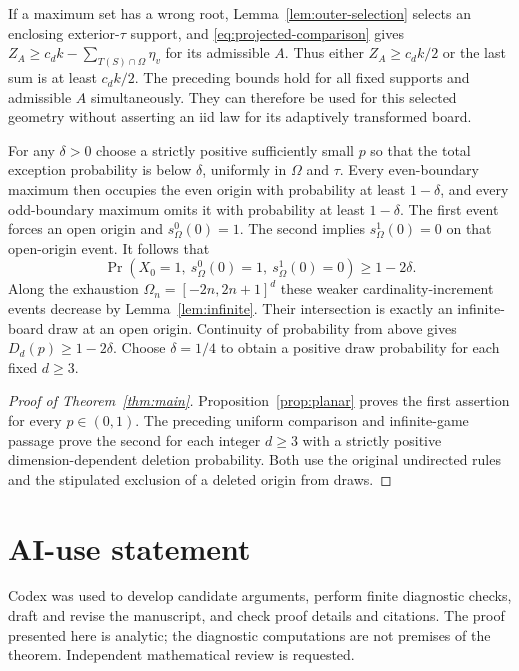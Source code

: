 \documentclass[11pt,a4paper]{article}
\numberwithin{equation}{section}
\begin{document}
If a maximum set has a wrong root, Lemma~\ref{lem:outer-selection}
selects an enclosing exterior-$\tau$ support, and
\eqref{eq:projected-comparison} gives
$Z_A\ge c_dk-\sum_{T(S)\cap\Omega}\eta_v$ for its admissible $A$.
Thus either $Z_A\ge c_dk/2$ or the last sum is at least $c_dk/2$.
The preceding bounds hold for all fixed supports and admissible $A$
simultaneously. They can therefore be used for this selected geometry
without asserting an iid law for its adaptively transformed board.

For any $\delta>0$ choose a strictly positive sufficiently small $p$
so that the total exception probability is below $\delta$, uniformly
in $\Omega$ and $\tau$. Every even-boundary maximum then occupies the
even origin with probability at least $1-\delta$, and every odd-boundary
maximum omits it with probability at least $1-\delta$.
The first event forces an open origin and $s_\Omega^0(0)=1$.
The second implies $s_\Omega^1(0)=0$ on that open-origin event.
It follows that
\[
 \Pr(X_0=1,\ s_\Omega^0(0)=1,\ s_\Omega^1(0)=0)\ge1-2\delta.
\]
Along the exhaustion $\Omega_n=[-2n,2n+1]^d$ these weaker
cardinality-increment events decrease by Lemma~\ref{lem:infinite}.
Their intersection is exactly an infinite-board draw at an open origin.
Continuity of probability from above gives $D_d(p)\ge1-2\delta$.
Choose $\delta=1/4$ to obtain a positive draw probability for each
fixed $d\ge3$.

\begin{proof}[Proof of Theorem~\ref{thm:main}]
Proposition~\ref{prop:planar} proves the first assertion for every
$p\in(0,1)$. The preceding uniform comparison and infinite-game passage
prove the second for each integer $d\ge3$ with a strictly positive
dimension-dependent deletion probability. Both use the original
undirected rules and the stipulated exclusion of a deleted origin
from draws.
\end{proof}

\section*{AI-use statement}
Codex was used to develop candidate arguments, perform finite diagnostic
checks, draft and revise the manuscript, and check proof details and
citations. The proof presented here is analytic; the diagnostic computations
are not premises of the theorem. Independent mathematical review is requested.
\end{document}
